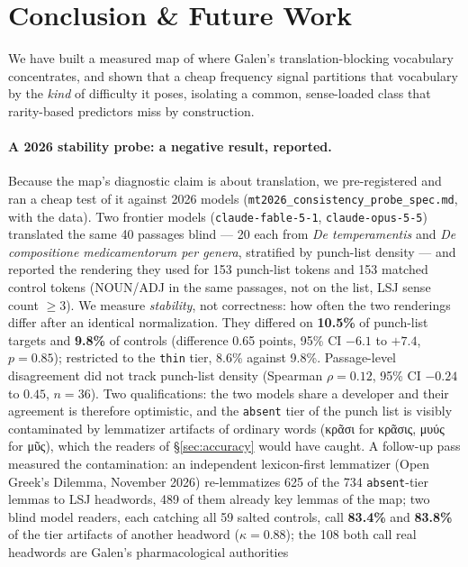 \documentclass[11pt]{article}
\begin{document}
\section{Conclusion \& Future Work}
\label{sec:conclusion}

We have built a measured map of where Galen's translation-blocking vocabulary concentrates, and
shown that a cheap frequency signal partitions that vocabulary by the \textit{kind} of difficulty it
poses, isolating a common, sense-loaded class that rarity-based predictors miss by construction.

\paragraph{A 2026 stability probe: a negative result, reported.}
Because the map's diagnostic claim is about translation, we pre-registered and ran a cheap test of
it against 2026 models (\texttt{mt2026\_consistency\_probe\_spec.md}, with the data). Two frontier
models (\texttt{claude-fable-5-1}, \texttt{claude-opus-5-5}) translated the same 40 passages
blind --- 20 each from \textit{De temperamentis} and \textit{De compositione medicamentorum per
genera}, stratified by punch-list density --- and reported the rendering they used for 153
punch-list tokens and 153 matched control tokens (NOUN/ADJ in the same passages, not on the list,
LSJ sense count $\ge 3$). We measure \emph{stability}, not correctness: how often the two renderings
differ after an identical normalization. They differed on \textbf{10.5\%} of punch-list targets
and \textbf{9.8\%} of controls (difference 0.65 points, 95\% CI $-6.1$ to $+7.4$, $p = 0.85$);
restricted to the \texttt{thin} tier, 8.6\% against 9.8\%. Passage-level disagreement did not
track punch-list density (Spearman $\rho = 0.12$, 95\% CI $-0.24$ to $0.45$, $n = 36$). Two
qualifications: the two models share a developer and their agreement is therefore optimistic, and
the \texttt{absent} tier of the punch list is visibly contaminated by lemmatizer artifacts of
ordinary words (κρᾶσι for κρᾶσις, μυύς for μῦς), which the readers of \S\ref{sec:accuracy} would
have caught. A follow-up pass measured the contamination: an independent lexicon-first lemmatizer
(Open Greek's Dilemma, November 2026) re-lemmatizes 625 of the 734 \texttt{absent}-tier lemmas to
LSJ headwords, 489 of them already key lemmas of the map; two blind model readers, each catching all
59 salted controls, call \textbf{83.4\%} and \textbf{83.8\%} of the tier artifacts of another
headword ($\kappa = 0.88$); the 108 both call real headwords are Galen's pharmacological authorities
\end{document}
